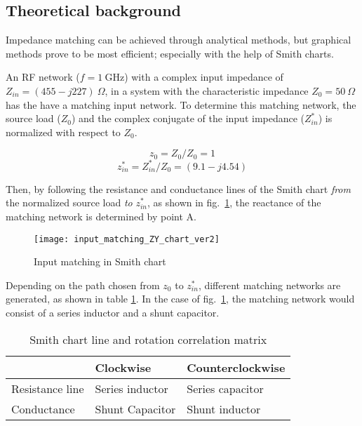 \documentclass[report.tex]{subfiles}
\begin{document}
\subsection{Theoretical background}
\label{seq:lab2 background}

Impedance matching can be achieved through analytical methods, but graphical methods prove to be most efficient; especially  with the help of Smith charts.

An RF network ($f=1~\text{GHz}$) with a complex input impedance of $Z_{in}=(455-j227)~\Omega$, in a system with the characteristic impedance $Z_0=50 ~\Omega$ has the have a matching input network. To determine this matching network, the source load ($Z_0$) and the complex conjugate of the input impedance ($Z_{in}^*$) is normalized with respect to $Z_0$.

\begin{equation*}
    z_0=Z_0/Z_0 = 1
\end{equation*}
\begin{equation*}
    z_{in}^*=Z_{in}^*/Z_0=(9.1-j4.54)
\end{equation*}

Then, by following the resistance and conductance lines of the Smith chart \emph{from} the normalized source load \emph{to} $z_{in}^*$, as shown in fig.~\ref{fig:input_matching_smith_chart}, the reactance of the matching network is determined by point A.

\begin{figure}[h]
    \centering
    \texttt{[image: input\_matching\_ZY\_chart\_ver2]}
    \caption{Input matching in Smith chart}
    \label{fig:input_matching_smith_chart}
\end{figure}

Depending on the path chosen from $z_0$ to $z_{in}^*$, different matching networks are generated, as shown in table \ref{tab:relations}. In the case of fig.~\ref{fig:input_matching_smith_chart}, the matching network would consist of a series inductor and a shunt capacitor.

\begin{table}[h]
    \centering
    \caption{Smith chart line and rotation correlation matrix}
    \label{tab:relations}
    \begin{tabular}{l | l l}
                        & Clockwise         & Counterclockwise  \\
        \hline
        Resistance line & Series inductor   & Series capacitor  \\
        Conductance     & Shunt Capacitor   & Shunt inductor    \\
    \end{tabular}
\end{table}
\end{document}
